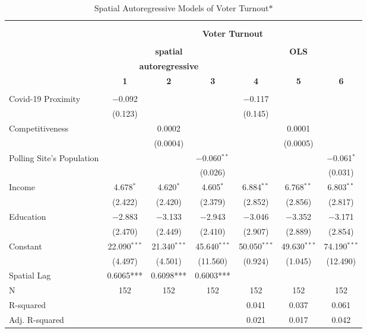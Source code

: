 \documentclass[
  12pt,
]{article}
\begin{document}
\newpage
\begin{landscape}
\normalsize
\begin{table}[!htbp] \centering 
  \caption{Spatial Autoregressive Models of Voter Turnout$*$} 
  \label{} 
\small 
\begin{tabular}{@{\extracolsep{5pt}}lcccccc} 
\\[-1.8ex]\hline \\[-1.8ex] 
\\[-1.8ex] & \multicolumn{6}{c}{\textbf{Voter Turnout}} \\ 
\\[-1.8ex] & \multicolumn{3}{c}{\textbf{spatial}} & \multicolumn{3}{c}{\textbf{OLS}} \\ 
 & \multicolumn{3}{c}{\textbf{autoregressive}} & \multicolumn{3}{c}{\textbf{}} \\ 
 & \textbf{1} & \textbf{2} & \textbf{3} & \textbf{4} & \textbf{5} & \textbf{6} \\ 
\hline \\[-1.8ex] 
 Covid-19 Proximity & $-$0.092 &  &  & $-$0.117 &  &  \\ 
  & (0.123) &  &  & (0.145) &  &  \\ 
  Competitiveness &  & 0.0002 &  &  & 0.0001 &  \\ 
  &  & (0.0004) &  &  & (0.0005) &  \\ 
  Polling Site's Population &  &  & $-$0.060$^{**}$ &  &  & $-$0.061$^{*}$ \\ 
  &  &  & (0.026) &  &  & (0.031) \\ 
  Income & 4.678$^{*}$ & 4.620$^{*}$ & 4.605$^{*}$ & 6.884$^{**}$ & 6.768$^{**}$ & 6.803$^{**}$ \\ 
  & (2.422) & (2.420) & (2.379) & (2.852) & (2.856) & (2.817) \\ 
  Education & $-$2.883 & $-$3.133 & $-$2.943 & $-$3.046 & $-$3.352 & $-$3.171 \\ 
  & (2.470) & (2.449) & (2.410) & (2.907) & (2.889) & (2.854) \\ 
  Constant & 22.090$^{***}$ & 21.340$^{***}$ & 45.640$^{***}$ & 50.050$^{***}$ & 49.630$^{***}$ & 74.190$^{***}$ \\ 
  & (4.497) & (4.501) & (11.560) & (0.924) & (1.045) & (12.490) \\ 
 Spatial Lag & 0.6065*** & 0.6098*** & 0.6003*** &  &  &  \\ 
N & 152 & 152 & 152 & 152 & 152 & 152 \\ 
R-squared &  &  &  & 0.041 & 0.037 & 0.061 \\ 
Adj. R-squared &  &  &  & 0.021 & 0.017 & 0.042 \\ 

\end{tabular}
\end{table}
\end{landscape}
\end{document}
